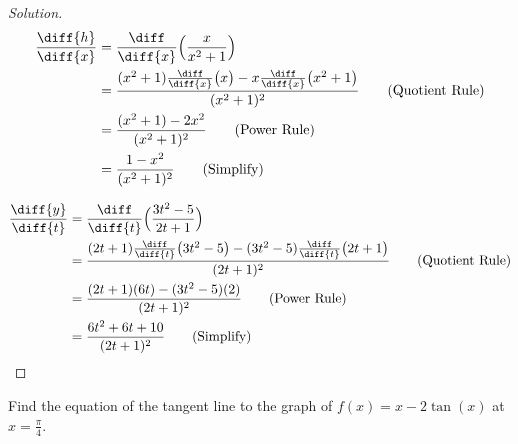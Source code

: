 \documentclass[crop=false,class=book,oneside]{standalone}
\begin{document}
            \begin{proof}[Solution]
                \par\hfill\par
                \begin{minipage}[b]{.49\textwidth}
                    \centering
                    \begin{align*}
                        \frac{\diff{h}}{\diff{x}}
                        &=\frac{\diff}{\diff{x}}
                            \Big(\frac{x}{x^{2}+1}\Big)\\
                        &=\frac{(x^{2}+1)\frac{\diff}{\diff{x}}
                            \big(x\big)-x\frac{\diff}{\diff{x}}
                            \big(x^{2}+1\big)}
                              {(x^{2}+1)^{2}}
                            \tag{Quotient Rule}\\
                        &=\frac{(x^{2}+1)-2x^{2}}{(x^{2}+1)^{2}}
                            \tag{Power Rule}\\
                        &=\frac{1-x^{2}}{(x^{2}+1)^{2}}
                            \tag{Simplify}
                    \end{align*}
                \end{minipage}
                \hfill
                \vline
                \begin{minipage}[b]{.49\textwidth}
                    \centering
                    \begin{align*}
                        \frac{\diff{y}}{\diff{t}}
                        &=\frac{\diff}{\diff{t}}
                            \Big(\frac{3t^{2}-5}{2t+1}\Big)\\
                        &=\frac{(2t+1)\frac{\diff}{\diff{t}}
                                \big(3t^{2}-5\big)-(3t^{2}-5)
                                \frac{\diff}{\diff{t}}\big(2t+1\big)}
                               {{(2t+1)^{2}}}
                                \tag{Quotient Rule}\\
                        &=\frac{(2t+1)(6t)-(3t^{2}-5)(2)}
                               {(2t+1)^{2}}
                            \tag{Power Rule}\\
                        &=\frac{6t^{2}+6t+10}{(2t+1)^{2}}
                            \tag{Simplify}
                    \end{align*}
                \end{minipage}
            \end{proof}
            \begin{problem}
                Find the equation of the tangent line
                to the graph of $f(x)=x-2\tan(x)$
                at $x=\frac{\pi}{4}$.
            \end{problem}
\end{document}
